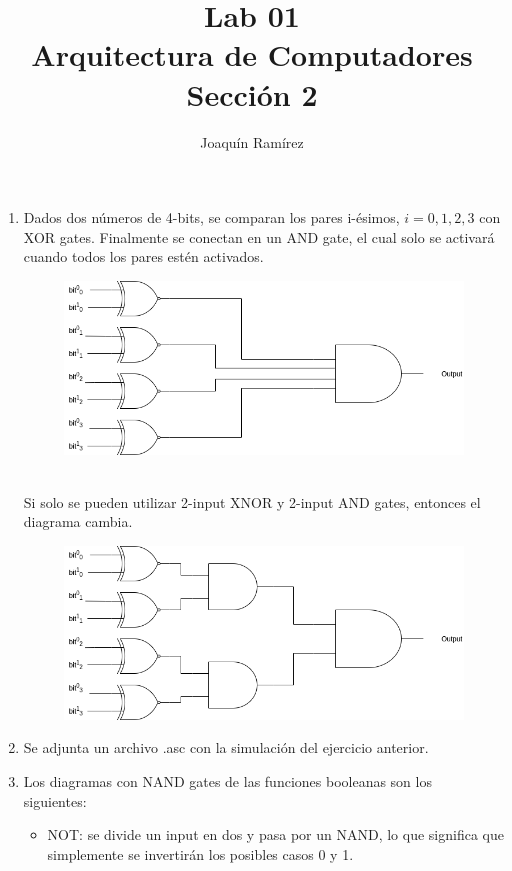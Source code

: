 \documentclass[11pt,a4paper]{article}
\title{Lab 01\\Arquitectura de Computadores \\ Sección 2}
\author{Joaquín Ramírez}
\begin{document}
\maketitle
\begin{enumerate}
\item Dados dos números de 4-bits, se comparan los pares i-ésimos, $i = 0, 1, 2, 3$ con XOR gates. Finalmente se conectan en un AND gate, el cual solo se activará cuando todos los pares estén activados.
\begin{figure}[h!]
\centering
\includegraphics[scale=0.4]{1.png} 
\end{figure}
\\
Si solo se pueden utilizar 2-input XNOR y 2-input AND gates, entonces el diagrama cambia.
\begin{figure}[h!]
\centering
\includegraphics[scale=0.4]{0.png} 
\end{figure}
\item Se adjunta un archivo .asc con la simulación del ejercicio anterior.
\item Los diagramas con NAND gates de las funciones booleanas son los \\siguientes:
\begin{itemize}
\item NOT: se divide un input en dos y pasa por un NAND, lo que significa que simplemente se invertirán los posibles casos 0 y 1.
\begin{figure}[h!]

\end{figure}
\end{itemize}
\end{enumerate}
\end{document}
